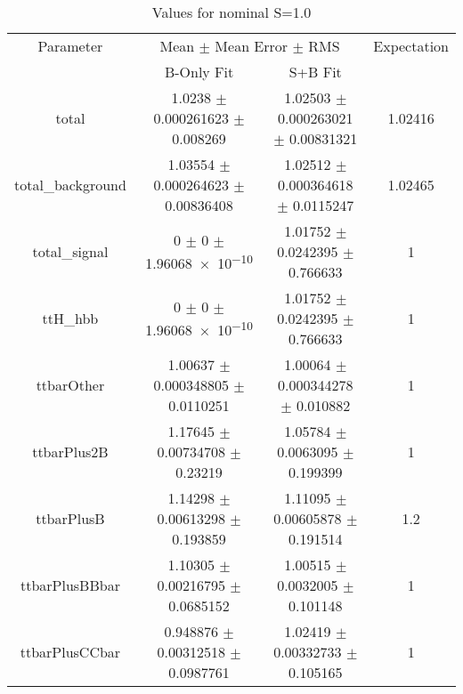 \begin{table}
\centering
\caption{Values for nominal S=1.0}
\begin{tabular}{cccc}
\toprule
Parameter & \multicolumn{2}{c}{Mean $\pm$ Mean Error $\pm$ RMS} & Expectation\\
 & B-Only Fit & S+B Fit & \\
\midrule
total & \num{1.0238} $\pm$ \num{0.000261623} $\pm$ \num{0.008269} & \num{1.02503} $\pm$ \num{0.000263021} $\pm$ \num{0.00831321} & \num{1.02416}\\
total\_background & \num{1.03554} $\pm$ \num{0.000264623} $\pm$ \num{0.00836408} & \num{1.02512} $\pm$ \num{0.000364618} $\pm$ \num{0.0115247} & \num{1.02465}\\
total\_signal & \num{0} $\pm$ \num{0} $\pm$ \num{1.96068e-10} & \num{1.01752} $\pm$ \num{0.0242395} $\pm$ \num{0.766633} & \num{1}\\
ttH\_hbb & \num{0} $\pm$ \num{0} $\pm$ \num{1.96068e-10} & \num{1.01752} $\pm$ \num{0.0242395} $\pm$ \num{0.766633} & \num{1}\\
ttbarOther & \num{1.00637} $\pm$ \num{0.000348805} $\pm$ \num{0.0110251} & \num{1.00064} $\pm$ \num{0.000344278} $\pm$ \num{0.010882} & \num{1}\\
ttbarPlus2B & \num{1.17645} $\pm$ \num{0.00734708} $\pm$ \num{0.23219} & \num{1.05784} $\pm$ \num{0.0063095} $\pm$ \num{0.199399} & \num{1}\\
ttbarPlusB & \num{1.14298} $\pm$ \num{0.00613298} $\pm$ \num{0.193859} & \num{1.11095} $\pm$ \num{0.00605878} $\pm$ \num{0.191514} & \num{1.2}\\
ttbarPlusBBbar & \num{1.10305} $\pm$ \num{0.00216795} $\pm$ \num{0.0685152} & \num{1.00515} $\pm$ \num{0.0032005} $\pm$ \num{0.101148} & \num{1}\\
ttbarPlusCCbar & \num{0.948876} $\pm$ \num{0.00312518} $\pm$ \num{0.0987761} & \num{1.02419} $\pm$ \num{0.00332733} $\pm$ \num{0.105165} & \num{1}\\
\bottomrule
\end{tabular}
\end{table}
